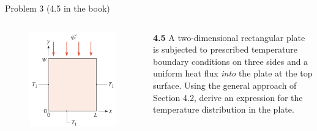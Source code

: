 \documentclass[9pt, aspectratio=169, handout]{beamer}
\begin{document}
\begin{frame}{Problem 3 (4.5 in the book)}
    \begin{columns}
        \begin{figure}
            \centering
            \includegraphics[width=1.0\textwidth]{Figures/fig2.2.jpg}
        \end{figure}
        \textbf{4.5} A two-dimensional rectangular plate is subjected to prescribed temperature boundary conditions on three sides and a uniform heat flux \textit{into} the plate at the top surface. Using the general approach of Section 4.2, derive an expression for the temperature distribution in the plate.
    \end{columns}
\end{frame}
\end{document}
